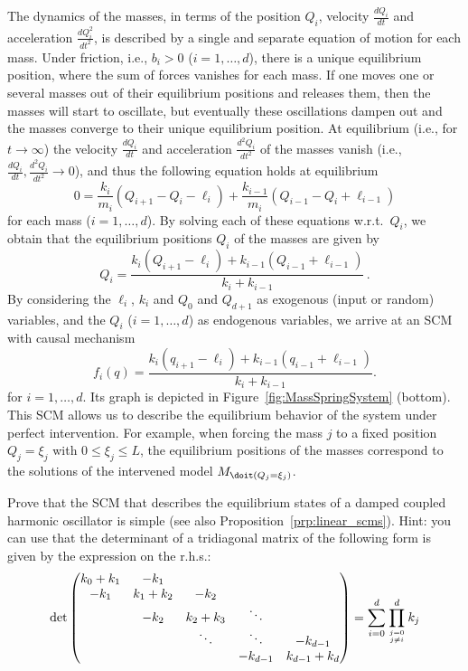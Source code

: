 \begin{Eg}
The dynamics of the masses, in terms of the position $Q_i$, velocity $\frac{dQ_i}{dt}$ and acceleration $\frac{dQ_i^2}{dt^2}$, is described by a single and separate equation of motion for each mass. Under friction, i.e., $b_i>0$ ($i=1,\dots,d$), there is a unique equilibrium position, where the sum of forces vanishes for each mass. If one moves one or several masses out of their equilibrium positions and releases them, then the masses will start to oscillate, but eventually these oscillations dampen out and the masses converge to their unique equilibrium position. At equilibrium (i.e., for $t\to\infty$) the velocity $\frac{dQ_i}{dt}$ and acceleration $\frac{d^2Q_i}{dt^2}$ of the masses vanish (i.e., $\frac{dQ_i}{dt},\frac{d^2Q_i}{dt^2}\to 0$), and thus the following equation holds at equilibrium
$$
  0 = \frac{k_i}{m_i} (Q_{i+1} - Q_i - \ell_i) + \frac{k_{i-1}}{m_i} (Q_{i-1} - Q_i + \ell_{i-1})
$$
for each mass ($i=1,\dots,d$). By solving each of these equations w.r.t.\ $Q_i$, we obtain that the equilibrium positions $Q_i$ of the masses are given by
$$
  Q_i = \frac{k_i(Q_{i+1} - \ell_i) + k_{i-1}(Q_{i-1}+\ell_{i-1})}{k_i + k_{i-1}}\,.
$$
By considering the $\ell_i$, $k_i$ and $Q_0$ and $Q_{d+1}$ as exogenous (input or random) variables, and the
$Q_i$ ($i=1,\dots,d$) as endogenous variables, we arrive at an SCM with causal mechanism
$$
f_i(q) = \frac{k_i(q_{i+1} - \ell_i) + k_{i-1}(q_{i-1}+\ell_{i-1})}{k_i + k_{i-1}}.
$$
for $i=1,\dots,d$.
Its graph is depicted in Figure~\ref{fig:MassSpringSystem} (bottom). This SCM allows us to describe the equilibrium behavior of the system under perfect intervention. For example, when forcing the mass $j$ to a fixed position $Q_j=\xi_j$ with $0\leq \xi_j\leq L$, the equilibrium positions of the masses correspond to the solutions of the intervened model $M_{\doit(Q_j=\xi_j)}$. 
\end{Eg}
\begin{Exc}
Prove that the SCM that describes the equilibrium states of a damped coupled harmonic oscillator is simple
(see also Proposition~\ref{prp:linear_scms}). Hint: you can use that the determinant of a tridiagonal matrix of the following
form is given by the expression on the r.h.s.:
  $$\det \begin{pmatrix}
    k_0+k_1 & -k_1       &           &         & \\
    -k_1     & k_1 + k_2 & -k_2       &         & \\
            & -k_2       & k_2 + k_3 & \ddots  & \\
            &           & \ddots    & \ddots  & -k_{d-1} \\
            &           &           & -k_{d-1} & k_{d-1} + k_d \\
  \end{pmatrix} = \sum_{i=0}^d \prod_{j=0 \atop j\ne i}^d k_j
  $$
\end{Exc}


